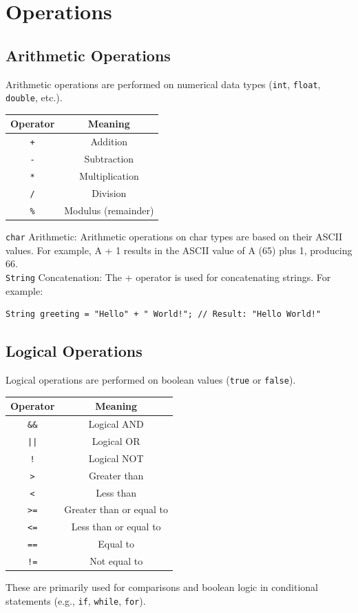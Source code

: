 \documentclass[letterpaper,12pt]{article}
\begin{document}
\section{Operations}
\subsection{Arithmetic Operations}
Arithmetic operations are performed on numerical data types (\texttt{int}, \texttt{float}, \texttt{double}, etc.).
\begin{center}
\noindent
\begin{tabular}{|c|c|}
    \hline
    \textbf{Operator} & \textbf{Meaning} \\ \hline
    \texttt{+} & Addition \\ \hline
    \texttt{-} & Subtraction \\ \hline
    \texttt{*} & Multiplication \\ \hline
    \texttt{/} & Division \\ \hline
    \texttt{\%} & Modulus (remainder) \\ \hline
\end{tabular}
\end{center}
\texttt{char} Arithmetic: Arithmetic operations on char types are based on their ASCII values. For example, A + 1 results in the ASCII value of A (65) plus 1, producing 66.\\
\texttt{String} Concatenation: The + operator is used for concatenating strings. For example:
\begin{verbatim}
String greeting = "Hello" + " World!"; // Result: "Hello World!"
\end{verbatim}
\subsection{Logical Operations}
Logical operations are performed on boolean values (\texttt{true} or \texttt{false}).
\begin{center}
\noindent
\begin{tabular}{|c|c|}
    \hline
    \textbf{Operator} & \textbf{Meaning} \\ \hline
    \texttt{\&\&} & Logical AND \\ \hline
    \texttt{||} & Logical OR \\ \hline
    \texttt{!} & Logical NOT \\ \hline
    \texttt{>} & Greater than \\ \hline
    \texttt{<} & Less than \\ \hline
    \texttt{>=} & Greater than or equal to \\ \hline
    \texttt{<=} & Less than or equal to \\ \hline
    \texttt{==} & Equal to \\ \hline
    \texttt{!=} & Not equal to \\ \hline
\end{tabular}
\end{center}
These are primarily used for comparisons and boolean logic in conditional statements (e.g., \texttt{if}, \texttt{while}, \texttt{for}).
\end{document}
